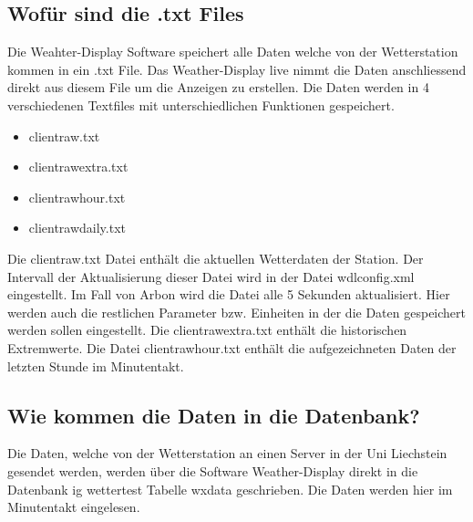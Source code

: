 \documentclass[a4paper,ngerman, 11pt, pagesize]{report}
\begin{document}
\subsection{Wofür sind die .txt Files}
Die Weahter-Display Software speichert alle Daten welche von der Wetterstation kommen in ein .txt File. Das Weather-Display live nimmt die Daten anschliessend direkt aus diesem File um die Anzeigen zu erstellen. Die Daten werden in 4 verschiedenen Textfiles mit unterschiedlichen Funktionen gespeichert.
\begin{itemize}  
\item clientraw.txt
\item clientrawextra.txt
\item clientrawhour.txt
\item clientrawdaily.txt
\end{itemize}

Die clientraw.txt Datei enthält die aktuellen Wetterdaten der Station. Der Intervall der Aktualisierung dieser Datei wird in der Datei wdlconfig.xml eingestellt. Im Fall von Arbon wird die Datei alle 5 Sekunden aktualisiert.  Hier werden auch die restlichen Parameter bzw. Einheiten in der die Daten gespeichert werden sollen eingestellt. Die clientrawextra.txt enthält die historischen Extremwerte. Die Datei clientrawhour.txt enthält die aufgezeichneten Daten der letzten Stunde im Minutentakt.\cite{WeatherDisplay}


\subsection{Wie kommen die Daten in die Datenbank?}
Die Daten, welche von der Wetterstation an einen Server in der Uni Liechstein gesendet werden, werden über die Software Weather-Display direkt in die Datenbank ig wettertest Tabelle wxdata geschrieben. Die Daten werden hier im Minutentakt eingelesen.
\end{document}
